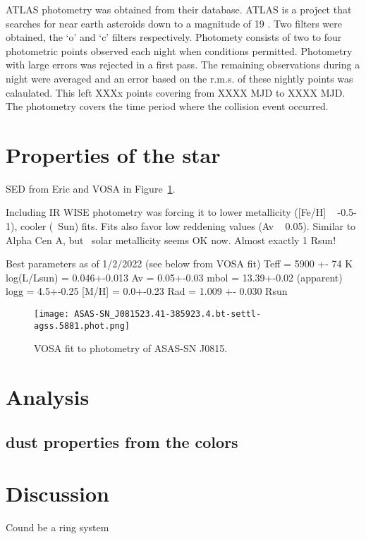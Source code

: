 \documentclass{aa}
\begin{document}
ATLAS photometry was obtained from their database.
ATLAS is a project that searches for near earth asteroids down to a magnitude of 19 
\citep{Tonry18}.
%
Two filters were obtained, the `o' and `c' filters respectively.
%
Photomety consists of two to four photometric points observed each night when conditions permitted.
%
Photometry with large errors was rejected in a first pass.
%
The remaining observations during a night were averaged and an error based on the r.m.s. of these nightly points was calaulated.
%
This left XXXx points covering from XXXX MJD to XXXX MJD.
%
The photometry covers the time period where the collision event occurred. 

\section{Properties of the star}

SED from Eric and VOSA in Figure~\ref{fig:sed}.

 Including IR WISE photometry
was forcing it to lower metallicity ([Fe/H] ~ -0.5-1), cooler (~Sun) fits. Fits also favor low reddening values (Av ~ 0.05). 
Similar to Alpha Cen A, but ~solar metallicity seems OK now. Almost exactly 1 Rsun! 

Best parameters as of 1/2/2022 (see below from VOSA fit) 
Teff = 5900 +- 74 K
log(L/Lsun) = 0.046+-0.013 
Av = 0.05+-0.03
mbol = 13.39+-0.02 (apparent)
logg = 4.5+-0.25
[M/H] = 0.0+-0.23 
Rad = 1.009 +- 0.030 Rsun


\begin{figure}
   \centering
   \texttt{[image: ASAS-SN\_J081523.41-385923.4.bt-settl-agss.5881.phot.png]}
      \caption{VOSA fit to photometry of ASAS-SN J0815.}
         \label{fig:sed}
   \end{figure}


\section{Analysis}

\subsection{dust properties from the colors}

\section{Discussion}

Cound be a ring system
\end{document}
